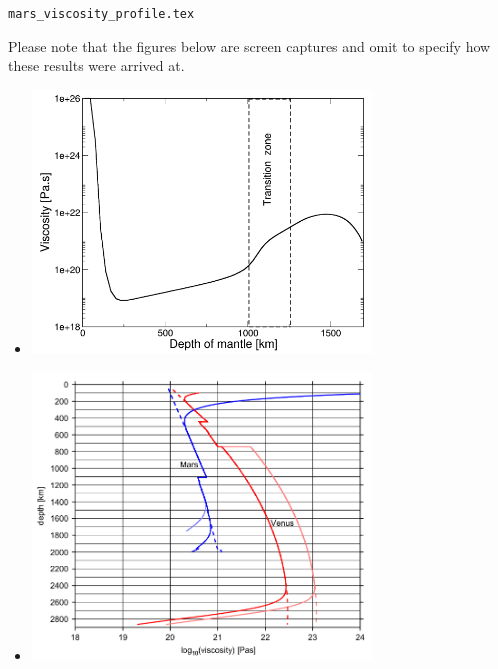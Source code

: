 \begin{flushright} {\tiny {\color{gray} \tt mars\_viscosity\_profile.tex}} \end{flushright}

Please note that the figures below are screen captures and omit to 
specify how these results were arrived at. 

\begin{itemize}


\item {}

\begin{center}
\includegraphics[width=9cm]{images/mars/viscosity/keta09}
\end{center}



\item {}

\begin{center}
\includegraphics[width=9cm]{images/mars/viscosity/stwt10}
\end{center}



\end{itemize}
